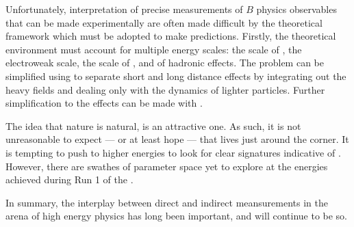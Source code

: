 
Unfortunately, interpretation of precise measurements of $B$ physics observables that can be made
experimentally are often made difficult by the theoretical framework which must be adopted to make
predictions.
Firstly, the theoretical environment must account for multiple energy scales: the scale of \np, the
electroweak scale, the scale of \QCD, and of hadronic effects.
The problem can be simplified using \EFT to separate short and long distance effects by integrating
out the heavy fields and dealing only with the dynamics of lighter particles.
Further simplification to the \QCD effects can be made with \HQET.

The idea that nature is natural, is an attractive one.
As such, it is not unreasonable to expect --- or at least hope --- that \np lives just
around the corner.
It is tempting to push to higher energies to look for clear signatures indicative of \np.
However, there are swathes of parameter space yet to explore at the energies achieved during Run 1
of the \lhc.



%
%
%
%
%







In summary, the interplay between direct and indirect meansurements in the arena of high energy
physics has long been important, and will continue to be so.






